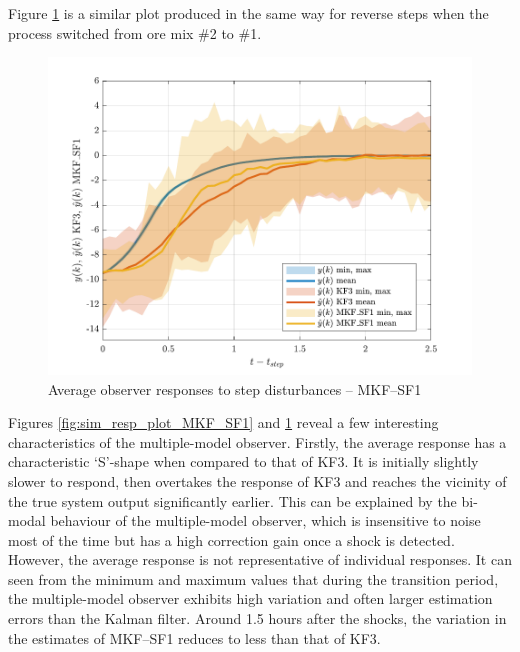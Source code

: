 Figure \ref{fig:sim_resp_plot2_MKF_SF1} is a similar plot produced in the same way for reverse steps when the process switched from ore mix \#2 to \#1.
\begin{figure}[htp]
	\centering
	\includegraphics[width=13cm]{images/grind1_rod_obs_sim_resp_plot2_MKF_SF1.pdf}
	\caption{Average observer responses to step disturbances -- MKF--SF1}
	\label{fig:sim_resp_plot2_MKF_SF1}
\end{figure}

Figures \ref{fig:sim_resp_plot_MKF_SF1} and \ref{fig:sim_resp_plot2_MKF_SF1} reveal a few interesting characteristics of the multiple-model observer. Firstly, the average response has a characteristic `S'-shape when compared to that of KF3. It is initially slightly slower to respond, then overtakes the response of KF3 and reaches the vicinity of the true system output significantly earlier. This can be explained by the bi-modal behaviour of the multiple-model observer, which is insensitive to noise most of the time but has a high correction gain once a shock is detected. However, the average response is not representative of individual responses. It can seen from the minimum and maximum values that during the transition period, the multiple-model observer exhibits high variation and often larger estimation errors than the Kalman filter. Around 1.5 hours after the shocks, the variation in the estimates of MKF--SF1 reduces to less than that of KF3. 

